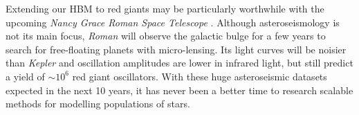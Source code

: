 
Extending our HBM to red giants may be particularly worthwhile with the upcoming \emph{Nancy Grace Roman Space Telescope} \citep[\emph{Roman}, formerly \emph{WFIRST};][]{Spergel.Gehrels.ea2015}. Although asteroseismology is not its main focus, \emph{Roman} will observe the galactic bulge for a few years to search for free-floating planets with micro-lensing. Its light curves will be noisier than \emph{Kepler} and oscillation amplitudes are lower in infrared light, but \citet{Gould.Huber.ea2015} still predict a yield of \(\sim 10^6\) red giant oscillators. With these huge asteroseismic datasets expected in the next 10 years, it has never been a better time to research scalable methods for modelling populations of stars.

